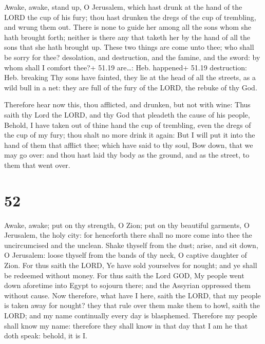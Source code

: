  Awake, awake, stand up, O Jerusalem, which hast drunk at
the hand of the LORD the cup of his fury; thou hast drunken the dregs of
the cup of trembling, and wrung them out.  There is none to
guide her among all the sons whom she hath brought forth; neither is
there any that taketh her by the hand of all the sons that she hath
brought up.  These two things are come unto thee; who shall
be sorry for thee? desolation, and destruction, and the famine, and the
sword: by whom shall I comfort thee?+ 51.19 are\ldots: Heb. happened+
51.19 destruction: Heb. breaking  Thy sons have fainted,
they lie at the head of all the streets, as a wild bull in a net: they
are full of the fury of the LORD, the rebuke of thy God.

 Therefore hear now this, thou afflicted, and drunken,
but not with wine:  Thus saith thy Lord the LORD, and thy
God that pleadeth the cause of his people, Behold, I have taken out of
thine hand the cup of trembling, even the dregs of the cup of my fury;
thou shalt no more drink it again:  But I will put it into
the hand of them that afflict thee; which have said to thy soul, Bow
down, that we may go over: and thou hast laid thy body as the ground,
and as the street, to them that went over.

\hypertarget{section-51}{%
\section{52}\label{section-51}}

 Awake, awake; put on thy strength, O Zion; put on thy
beautiful garments, O Jerusalem, the holy city: for henceforth there
shall no more come into thee the uncircumcised and the unclean.
 Shake thyself from the dust; arise, and sit down, O
Jerusalem: loose thyself from the bands of thy neck, O captive daughter
of Zion.  For thus saith the LORD, Ye have sold yourselves
for nought; and ye shall be redeemed without money.  For
thus saith the Lord GOD, My people went down aforetime into Egypt to
sojourn there; and the Assyrian oppressed them without cause.
 Now therefore, what have I here, saith the LORD, that my
people is taken away for nought? they that rule over them make them to
howl, saith the LORD; and my name continually every day is blasphemed.
 Therefore my people shall know my name: therefore they
shall know in that day that I am he that doth speak: behold, it is I.


